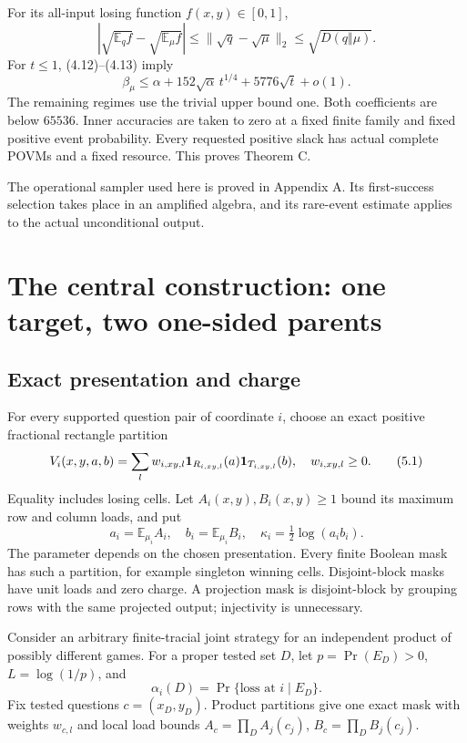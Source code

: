 \documentclass[11pt,reqno]{amsart}
\numberwithin{equation}{section}
\begin{document}
For its all-input losing function \(f(x,y)\in[0,1]\), \[
 |\sqrt{\mathbb E_qf}-\sqrt{\mathbb E_\mu f}|
 \le\|\sqrt q-\sqrt\mu\|_2\le\sqrt{D(q\Vert\mu)}. \tag{4.13}
\] For \(t\le1\), (4.12)--(4.13) imply \[
 \beta_\mu\le\alpha+152\sqrt\alpha\,t^{1/4}
                         +5776\sqrt t+o(1).
\] The remaining regimes use the trivial upper bound one. Both coefficients are below \(65536\). Inner accuracies are taken to zero at a fixed finite family and fixed positive event probability. Every requested positive slack has actual complete POVMs and a fixed resource. This proves Theorem C.

The operational sampler used here is proved in Appendix A. Its first-success selection takes place in an amplified algebra, and its rare-event estimate applies to the actual unconditional output.

\section{The central construction: one target, two one-sided parents}\label{the-central-construction-one-target-two-one-sided-parents}

\subsection{Exact presentation and charge}\label{exact-presentation-and-charge}

For every supported question pair of coordinate \(i\), choose an exact positive fractional rectangle partition \[
 V_i(x,y,a,b)=\sum_lw_{i,xy,l}
                 {\bf1}_{R_{i,xy,l}}(a){\bf1}_{T_{i,xy,l}}(b),
 \quad w_{i,xy,l}\ge0. \tag{5.1}
\] Equality includes losing cells. Let \(A_i(x,y),B_i(x,y)\ge1\) bound its maximum row and column loads, and put \[
 a_i=\mathbb E_{\mu_i}A_i,\quad b_i=\mathbb E_{\mu_i}B_i,\quad
 \kappa_i=\tfrac12\log(a_ib_i). \tag{5.2}
\] The parameter depends on the chosen presentation. Every finite Boolean mask has such a partition, for example singleton winning cells. Disjoint-block masks have unit loads and zero charge. A projection mask is disjoint-block by grouping rows with the same projected output; injectivity is unnecessary.

Consider an arbitrary finite-tracial joint strategy for an independent product of possibly different games. For a proper tested set \(D\), let \(p=\Pr(E_D)>0\), \(L=\log(1/p)\), and \[
 \alpha_i(D)=\Pr\{\text{loss at }i\mid E_D\}.
 \tag{5.3}
\] Fix tested questions \(c=(x_D,y_D)\). Product partitions give one exact mask with weights \(w_{c,l}\) and local load bounds \(A_c=\prod_D A_j(c_j)\), \(B_c=\prod_D B_j(c_j)\).
\end{document}
